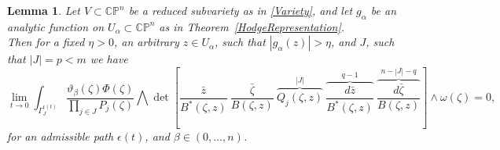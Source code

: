 \documentclass[11pt,reqno]{amsart}
\numberwithin{equation}{section}
\newtheorem{lemma}[proposition]{Lemma}
\begin{document}
\begin{lemma}\label{ZeroTerms} Let $V\subset {{\mathbb C}}{{\mathbb P}}^n$ be a reduced subvariety
as in \eqref{Variety}, and let $g_{\alpha}$ be an analytic function on
$U_{\alpha}\subset {{\mathbb C}}{{\mathbb P}}^n$ as in Theorem~\ref{HodgeRepresentation}.\\
\indent
Then for a fixed $\eta>0$, an arbitrary $z\in U_{\alpha}$,
such that $|g_{\alpha}(z)|>\eta$, and $J$, such that $|J|=p<m$ we have
\begin{equation}\label{ZeroDeterminants}
\lim_{t\to 0}\int_{\Gamma^{\epsilon(t)}_J}
\frac{\vartheta_{\beta}(\zeta)\Phi(\zeta)}{\prod_{j\in J}P_j(\zeta)}
\bigwedge\det\left[\frac{\bar z}{B^*(\zeta,z)}\ \frac{\bar\zeta}{B(\zeta,z)}\
\overbrace{Q_j(\zeta,z)}^{|J|}\
\overbrace{\frac{d{\bar z}}{B^*(\zeta,z)}}^{q-1}\
\overbrace{\frac{d{\bar\zeta}}{B(\zeta,z)}}^{n-|J|-q}\right]\wedge\omega(\zeta)=0,
\end{equation}
for an admissible path $\epsilon(t)$, and $\beta\in (0,\dots,n)$.
\end{lemma}
\end{document}
